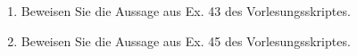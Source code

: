 
\begin{exercise}

\phantom{}

\begin{enumerate}[label = \textbf{\alph*)}]

  \item Beweisen Sie die Aussage aus Ex. 43 des Vorlesungsskriptes.


  \item Beweisen Sie die Aussage aus Ex. 45 des Vorlesungsskriptes.


\end{enumerate}

\end{exercise}


